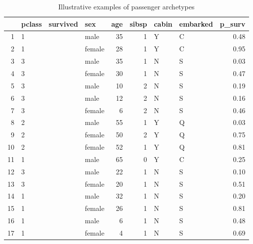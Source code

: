 \documentclass[]{extarticle}
\begin{document}
\begin{table}[ht]
	\centering
	\begin{tabular}{rlllrrllr}
		\hline
		& pclass & survived & sex & age & sibsp & cabin & embarked & p\_surv \\ 
		\hline
		1 & 1 &  & male &  35 &   1 & Y & C & 0.48 \\ 
		2 & 1 &  & female &  28 &   1 & Y & C & 0.95 \\ 
		3 & 3 &  & male &  35 &   1 & N & S & 0.03 \\ 
		4 & 3 &  & female &  30 &   1 & N & S & 0.47 \\ 
		5 & 3 &  & male &  10 &   2 & N & S & 0.19 \\ 
		6 & 3 &  & male &  12 &   2 & N & S & 0.16 \\ 
		7 & 3 &  & female &   6 &   2 & N & S & 0.46 \\ 
		8 & 2 &  & male &  55 &   1 & Y & Q & 0.03 \\ 
		9 & 2 &  & female &  50 &   2 & Y & Q & 0.75 \\ 
		10 & 2 &  & female &  52 &   1 & Y & Q & 0.81 \\ 
		11 & 1 &  & male &  65 &   0 & Y & C & 0.25 \\ 
		12 & 3 &  & male &  22 &   1 & N & S & 0.10 \\ 
		13 & 3 &  & female &  20 &   1 & N & S & 0.51 \\ 
		14 & 1 &  & male &  32 &   1 & N & S & 0.20 \\ 
		15 & 1 &  & female &  26 &   1 & N & S & 0.81 \\ 
		16 & 1 &  & male &   6 &   1 & N & S & 0.48 \\ 
		17 & 1 &  & female &   4 &   1 & N & S & 0.69 \\ 
		\hline
	\end{tabular}
\caption{Illustrative examples of passenger archetypes}
\label{tab:illdata}
\end{table}
\end{document}
